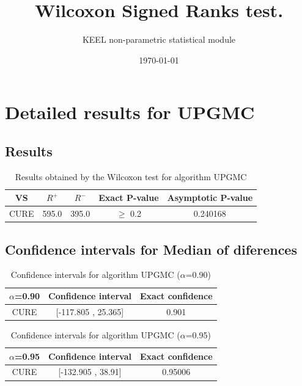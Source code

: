 \documentclass[a4paper,10pt]{article}
\title{Wilcoxon Signed Ranks test.}
\date{\today}
\author{KEEL non-parametric statistical module}
\begin{document}
\pagestyle{empty}
\maketitle
\thispagestyle{empty}



\section{Detailed results for UPGMC}


\subsection{Results}

\begin{table}[!htp]
\centering\small
\begin{tabular}{
|c|c|c|c|c|}
\hline
 VS & $R^{+}$ & $R^{-}$ & Exact P-value & Asymptotic P-value \\ \hline 
CURE & 595.0 & 395.0 & $\geq$ 0.2 & 0.240168\\ \hline 

\end{tabular}
\caption{Results obtained by the Wilcoxon test for algorithm UPGMC}
\end{table}

\subsection{Confidence intervals for Median of diferences}

\begin{table}[!htp]
\centering\small
\begin{tabular}{
|c|c|c|}
\hline
 $\alpha$=0.90 & Confidence interval & Exact confidence \\ \hline 
CURE & [-117.805 , 25.365] & 0.901\\ \hline 

\end{tabular}
\caption{Confidence intervals for algorithm UPGMC ($\alpha$=0.90)}
\end{table}
\begin{table}[!htp]
\centering\small
\begin{tabular}{
|c|c|c|}
\hline
 $\alpha$=0.95 & Confidence interval & Exact confidence \\ \hline 
CURE & [-132.905 , 38.91] & 0.95006\\ \hline 

\end{tabular}
\caption{Confidence intervals for algorithm UPGMC ($\alpha$=0.95)}
\end{table}
\end{document}
